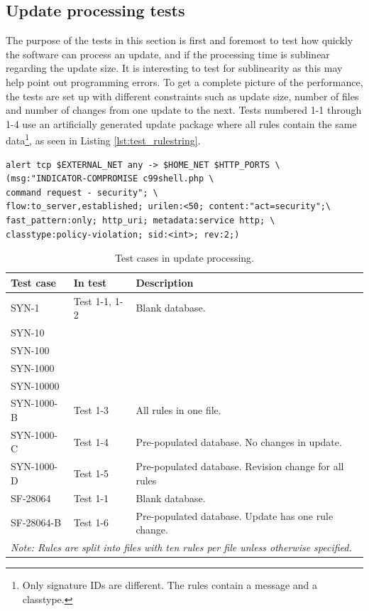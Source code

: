 \subsection{Update processing tests}
The purpose of the tests in this section is first and foremost to test how
quickly the software can process an update, and if the processing time is
sublinear regarding the update size. It is interesting to test for sublinearity
as this may help point out programming errors. To get a complete picture of the
performance, the tests are set up with different constraints such as update
size, number of files and number of changes from one update to the next. Tests
numbered 1-1 through 1-4 use an artificially generated update package where all
rules contain the same data\footnote{Only signature IDs are different. The rules
contain a message and a classtype.}, as seen in Listing
\ref{lst:test_rulestring}.

\begin{lstlisting}[frame=single, caption=Test rule string.,
label=lst:test_rulestring,captionpos=b]
alert tcp $EXTERNAL_NET any -> $HOME_NET $HTTP_PORTS \
(msg:"INDICATOR-COMPROMISE c99shell.php \
command request - security"; \
flow:to_server,established; urilen:<50; content:"act=security";\
fast_pattern:only; http_uri; metadata:service http; \
classtype:policy-violation; sid:<int>; rev:2;)
\end{lstlisting}
\renewcommand{\arraystretch}{1.5}

\begin{table}[h!]
  \centering
  \begin{tabular}{l|l|l}
  	\multicolumn{1}{l|}{Test case} & \multicolumn{1}{|l|}{In test} &
  	\multicolumn{1}{l}{Description}\\
	\hline
		SYN-1 & Test 1-1, 1-2 & Blank database. \\ 
		SYN-10 && \\
		SYN-100&&\\
		SYN-1000&&\\
		SYN-10000&&\\
	\hline
		SYN-1000-B & Test 1-3 & All rules in one file.\\
	\hline		
		SYN-1000-C & Test 1-4 & Pre-populated database. No changes in update. \\
	\hline
		SYN-1000-D & Test 1-5 & Pre-populated database. Revision change for all rules
		\\
	\hline
		SF-28064 & Test 1-1 & Blank database. \\
	\hline
		SF-28064-B & Test 1-6 & Pre-populated database. Update has one rule change.\\
	\hline
	\multicolumn{3}{l}{\textit{Note: Rules are split into files with ten rules per
	file unless otherwise specified.}}
  \end{tabular}
  \caption{Test cases in update processing.}
  \label{tab:updateTests}
\end{table}

